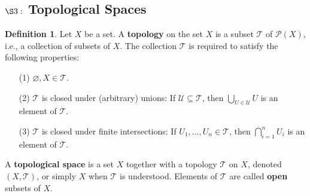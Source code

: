 \documentclass[9pt,reqno]{amsart}
\theoremstyle{definition}
\newtheorem{defi}{Definition}[section]
\begin{document}
\subsection{$\S 3:$ Topological Spaces}
\begin{defi}
Let $X$ be a set. A \textbf{topology} on the set $X$ is a subset $\mathcal T$ of $\mathcal P(X)$, i.e., a collection of subsets of $X$. The collection $\mathcal T$ is required to satisfy the following properties:
	\begin{itemize}
		\item [(1)] $\varnothing, X \in \mathcal T$.
		\item [(2)] $\mathcal T$ is closed under (arbitrary) unions: If $\mathcal U\subseteq \mathcal T$, then $\bigcup _{U \in \mathcal U} U$ is an element of $\mathcal T$.
		\item [(3)] $\mathcal T$ is closed under finite intersections: If $U_1, \ldots, U_n \in \mathcal T$, then $\bigcap _{i=1}^n U_i$ is an element of $\mathcal T$.
	\end{itemize}
	A \textbf{topological space} is a set $X$ together with a topology $\mathcal T$ on $X$, denoted $(X, \mathcal T)$, or simply $X$ when $\mathcal T$ is understood. Elements of $\mathcal T$ are called \textbf{open} subsets of $X$.
\end{defi}
\end{document}

